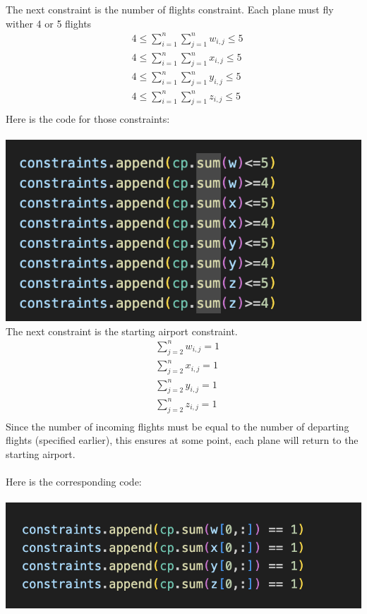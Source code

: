 \documentclass[12pt]{extarticle}
\begin{document}
The next constraint is the number of flights constraint. Each plane must fly wither 4 or 5 flights
\begin{align*}
&4 \leq\sum_{i=1}^n\sum_{j=1}^nw_{i,j} \leq 5 \\
&4 \leq\sum_{i=1}^n\sum_{j=1}^nx_{i,j} \leq 5 \\
&4 \leq\sum_{i=1}^n\sum_{j=1}^ny_{i,j} \leq 5 \\
&4 \leq\sum_{i=1}^n\sum_{j=1}^nz_{i,j} \leq 5 \\
\end{align*}
Here is the code for those constraints: \\ \\
\includegraphics[scale = .5]{images/constraints4.png} \\

The next constraint is the starting airport constraint.
\begin{align*}
&\sum_{j=2}^nw_{i,j} = 1 \\
&\sum_{j=2}^nx_{i,j} = 1 \\
&\sum_{j=2}^ny_{i,j} = 1 \\
&\sum_{j=2}^nz_{i,j} = 1 \\
\end{align*}
Since the number of incoming flights must be equal to the number of departing flights (specified earlier), this ensures at some point, each plane will return to the starting airport. \\ \\
Here is the corresponding code:\\ \\
\includegraphics[scale = .5]{images/constraints5.png} \\
\end{document}
